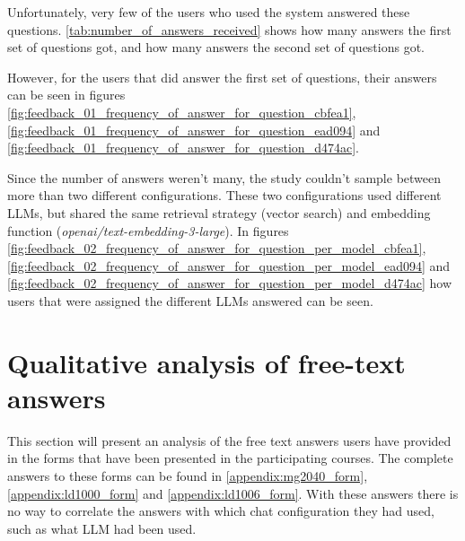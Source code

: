 Unfortunately, very few of the users who used the system answered these questions. \autoref{tab:number_of_answers_received} shows how many answers the first set of questions got, and how many answers the second set of questions got.


However, for the users that did answer the first set of questions, their answers can be seen in figures \ref{fig:feedback_01_frequency_of_answer_for_question_cbfea1}, \ref{fig:feedback_01_frequency_of_answer_for_question_ead094} and \ref{fig:feedback_01_frequency_of_answer_for_question_d474ac}.




















Since the number of answers weren't many, the study couldn’t sample between more than two different configurations. These two configurations used different \gls{LLM}s, but shared the same retrieval strategy (vector search) and embedding function (\textit{openai/text-embedding-3-large}). In figures \ref{fig:feedback_02_frequency_of_answer_for_question_per_model_cbfea1}, \ref{fig:feedback_02_frequency_of_answer_for_question_per_model_ead094} and \ref{fig:feedback_02_frequency_of_answer_for_question_per_model_d474ac} how users that were assigned the different \gls{LLM}s answered can be seen.











\section{Qualitative analysis of free-text answers}
\label{sec:qualitative_analysis_of_user_responses}


This section will present an analysis of the free text answers users have provided in the forms that have been presented in the participating courses. The complete answers to these forms can be found in \autoref{appendix:mg2040_form}, \autoref{appendix:ld1000_form} and \autoref{appendix:ld1006_form}. With these answers there is no way to correlate the answers with which chat configuration they had used, such as what \gls{LLM} had been used.



